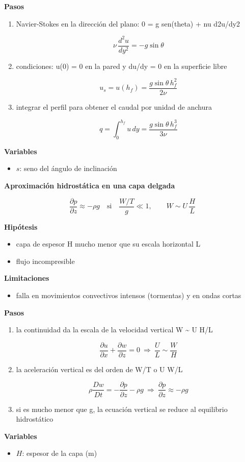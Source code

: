 \documentclass[10pt,openany]{book}
\begin{document}
\begin{tcolorbox}[title={Desarrollos del modelo}, studiumdef, breakable]
\noindent\textbf{Pasos}
\begin{enumerate}
\item
Navier-Stokes en la dirección del plano: 0 = g sen(theta) + nu d2u/dy2

\[
\nu\,\frac{d^{2}u}{dy^{2}} = -g\sin\theta
\]
\item
condiciones: u(0) = 0 en la pared y du/dy = 0 en la superficie libre

\[
u_s = u(h_f) = \frac{g\sin\theta\,h_f^{2}}{2\nu}
\]
\item
integrar el perfil para obtener el caudal por unidad de anchura

\[
q = \int_0^{h_f}u\,dy = \frac{g\sin\theta\,h_f^{3}}{3\nu}
\]
\end{enumerate}

\noindent\textbf{Variables}
\begin{itemize}
\item $s$: seno del ángulo de inclinación
\end{itemize}



\noindent\textbf{Aproximación hidrostática en una capa delgada}

\[
\frac{\partial p}{\partial z} \approx -\rho g\quad \text{si}\quad \frac{W/T}{g} \ll 1,\qquad W \sim U\,\frac{H}{L}
\]

\noindent\textbf{Hipótesis}
\begin{itemize}
\item capa de espesor H mucho menor que su escala horizontal L
\item flujo incompresible
\end{itemize}

\noindent\textbf{Limitaciones}
\begin{itemize}
\item falla en movimientos convectivos intensos (tormentas) y en ondas cortas
\end{itemize}

\noindent\textbf{Pasos}
\begin{enumerate}
\item
la continuidad da la escala de la velocidad vertical W \textasciitilde{} U H/L

\[
\frac{\partial u}{\partial x} + \frac{\partial w}{\partial z} = 0\ \Rightarrow\ \frac{U}{L} \sim \frac{W}{H}
\]
\item
la aceleración vertical es del orden de W/T o U W/L

\[
\rho\frac{Dw}{Dt} = -\frac{\partial p}{\partial z} - \rho g\ \Rightarrow\ \frac{\partial p}{\partial z} \approx -\rho g
\]
\item
si es mucho menor que g, la ecuación vertical se reduce al equilibrio hidrostático
\end{enumerate}

\noindent\textbf{Variables}
\begin{itemize}
\item $H$: espesor de la capa ($\mathrm{m}$)
\end{itemize}


\end{tcolorbox}
\end{document}
